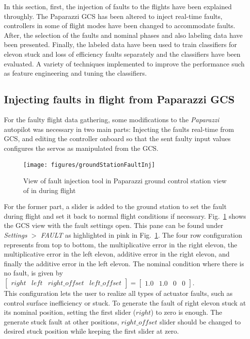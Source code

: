 In this section, first, the injection of faults to the flights have been explained throughly. 
The Paparazzi GCS has been altered to inject real-time faults, controllers in some of flight modes have been changed to accommodate faults. 
After, the selection of the faults and nominal phases and also labeling data have been presented. 
Finally, the labeled data have been used to train classifiers for elevon stuck and loss of efficiency faults separately and the classifiers have been evaluated. 
A variety of techniques implemented to improve the performance such as feature engineering and tuning the classifiers. 

\subsection{Injecting faults in flight from Paparazzi GCS}

For the faulty flight data gathering, some modifications to the \emph{Paparazzi} autopilot was necessary in two main parts: Injecting the faults real-time from GCS, and editing the controller onboard so that the sent faulty input values configures the servos as manipulated from the GCS. 

\begin{figure}
\begin{center}
\texttt{[image: figures/groundStationFaultInj]}    %
\caption{View of fault injection tool in Paparazzi ground control station view of in during flight} 
\label{fig:groundStationFaultInj}
\end{center}
\end{figure}

For the former part, a slider is added to the ground station to set the fault during flight and set it back to normal flight conditions if necessary. 
Fig.~\ref{fig:groundStationFaultInj} shows the GCS view with the fault settings open. 
This pane can be found under  \emph{Settings} $>$  \emph{FAULT} as highlighted in pink in Fig.~\ref{fig:groundStationFaultInj}. 
The four row configuration represents from top to bottom, the multiplicative error in the right elevon, the multiplicative error in the left elevon, additive error in the right elevon, and finally the additive error in the left elevon. 
The nominal condition where there is no fault, is given by $[\begin{matrix}right & left & right\_offset &left\_offset\end{matrix}] = [\begin{matrix} 1.0 & 1.0 & 0 & 0\end{matrix}]$. \\
This configuration lets the user to realize all types of actuator faults, such as control surface inefficiency or stuck. 
To generate the fault of right elevon stuck at its nominal position, setting the first slider ($right$) to zero is enough. 
The generate stuck fault at other positions, $right\_offset$ slider should be changed to desired stuck position while keeping the first slider at zero. 


